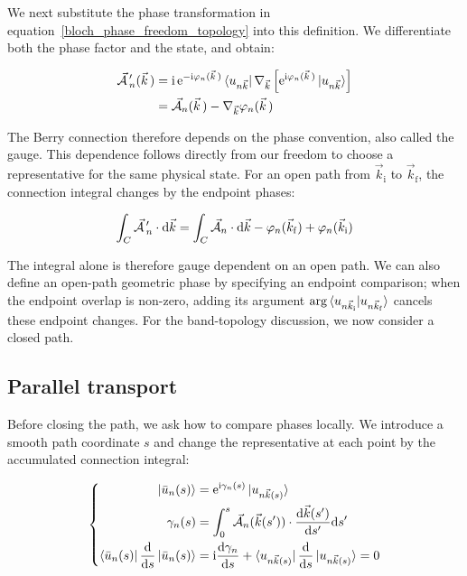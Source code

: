 We next substitute the phase transformation in equation~\eqref{bloch_phase_freedom_topology} into this definition.
We differentiate both the phase factor and the state, and obtain:

\begin{equation}
\begin{aligned}
    \vec{\mathcal{A}}\,'_n(\vec{k}\,)
    &=\mathrm{i}\,\mathrm{e}^{-\mathrm{i}\varphi_n(\vec{k}\,)}
    \bra{u_{n\vec{k}}}\nabla_{\vec{k}}
    \left[\mathrm{e}^{\mathrm{i}\varphi_n(\vec{k}\,)}\ket{u_{n\vec{k}}}\right] \\
    &=\vec{\mathcal{A}}_n(\vec{k}\,)-\nabla_{\vec{k}}\varphi_n(\vec{k}\,)
\end{aligned}
\label{berry_connection_gauge_transformation_topology}
\end{equation}

The Berry connection therefore depends on the phase convention, also called the gauge.
This dependence follows directly from our freedom to choose a representative for the same physical state.
For an open path from $\vec{k}_\mathrm{i}$ to $\vec{k}_\mathrm{f}$, the connection integral changes by the endpoint phases:

\begin{equation}
    \int_C\vec{\mathcal{A}}\,'_n\cdot\mathrm{d}\vec{k}
    =\int_C\vec{\mathcal{A}}_n\cdot\mathrm{d}\vec{k}
    -\varphi_n(\vec{k}_\mathrm{f})+\varphi_n(\vec{k}_\mathrm{i})
\label{open_path_gauge_endpoints_appendix}
\end{equation}

The integral alone is therefore gauge dependent on an open path.
We can also define an open-path geometric phase by specifying an endpoint comparison;
when the endpoint overlap is non-zero, adding its argument
$\arg\braket{u_{n\vec{k}_\mathrm{i}}|u_{n\vec{k}_\mathrm{f}}}$ cancels these endpoint changes.
For the band-topology discussion, we now consider a closed path.

\subsection{Parallel transport}

Before closing the path, we ask how to compare phases locally.
We introduce a smooth path coordinate $s$ and change the representative at each point by the accumulated connection integral:

\begin{equation}
\left\{\begin{aligned}
    \ket{\bar{u}_n(s)}
    &=\mathrm{e}^{\mathrm{i}\gamma_n(s)}\ket{u_{n\vec{k}(s)}} \\
    \gamma_n(s)&=\int_0^s\vec{\mathcal{A}}_n(\vec{k}(s'))
    \cdot\frac{\mathrm{d}\vec{k}(s')}{\mathrm{d} s'}\mathrm{d} s' \\
    \bra{\bar{u}_n(s)}\frac{\mathrm{d}}{\mathrm{d} s}\ket{\bar{u}_n(s)}
    &=\mathrm{i}\frac{\mathrm{d}\gamma_n}{\mathrm{d} s}
    +\bra{u_{n\vec{k}(s)}}\frac{\mathrm{d}}{\mathrm{d} s}\ket{u_{n\vec{k}(s)}}=0
\end{aligned}\right.
\label{parallel_transport_berry_appendix}
\end{equation}

